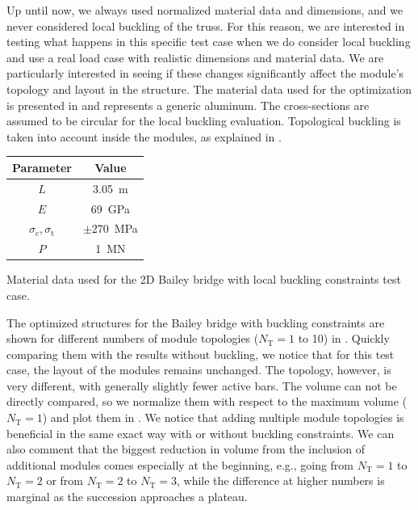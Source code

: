 Up until now, we always used normalized material data and dimensions, and we never considered local buckling of the truss. For this reason, we are interested in testing what happens in this specific test case when we do consider local buckling and use a real load case with realistic dimensions and material data. We are particularly interested in seeing if these changes significantly affect the module's topology and layout in the structure. The material data used for the optimization is presented in  and represents a generic aluminum. The cross-sections are assumed to be circular for the local buckling evaluation. Topological buckling is taken into account inside the modules, as explained in .

\begin{margintable}
    \small
    \centering
    \begin{tabular}{cc}
    \toprule
    \textbf{Parameter}        & \textbf{Value} \\ \midrule
    $L$              & \qty{3.05}{m}     \\
    $E$              & \qty{69}{GPa}     \\
    $\sigma_\text{c}, \sigma_\text{t}$ & $\pm $\qty{270}{MPa} \\
    $P$              & \qty{1}{MN}   \\
    \bottomrule
    \end{tabular}
    \caption{Material data used for the 2D Bailey bridge with local buckling constraints test case.}
    \label{tab:06_modular_tug_buck}
\end{margintable}

The optimized structures for the Bailey bridge with buckling constraints are shown for different numbers of module topologies ($N_\text{T}=1$ to 10) in . Quickly comparing them with the results without buckling, we notice that for this test case, the layout of the modules remains unchanged. The topology, however, is very different, with generally slightly fewer active bars. The volume can not be directly compared, so we normalize them with respect to the maximum volume ($N_\text{T}=1$) and plot them in . We notice that adding multiple module topologies is beneficial in the same exact way with or without buckling constraints. We can also comment that the biggest reduction in volume from the inclusion of additional modules comes especially at the beginning, e.g., going from $N_\text{T}=1$ to $N_\text{T}=2$ or from $N_\text{T}=2$ to $N_\text{T}=3$, while the difference at higher numbers is marginal as the succession approaches a plateau.

